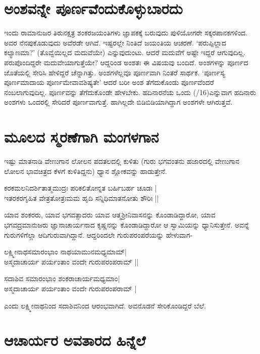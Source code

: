 \section*{ಅಂಶವನ್ನೇ ಪೂರ್ಣವೆಂದುಕೊಳ್ಳುಬಾರದು}

ಇಂದು ರಾಮಾನುಜರ ತಿರುನಕ್ಷತ್ರ ಶಂಕರಜಯಂತಿಗಳು ಜ್ಞಾಪಕಕ್ಕೆ ಬರುವುದು ಪುಳಿಯೋಗರೇ ಸಕ್ಕರಪಾನಕಗಳಿಂದ. ಅವರ ನೆನಪುಕೊಡುವುದು ಅವೆರಡೇ ಆಗಿವೆ. ಇಷ್ಟರಲ್ಲೇ ನಿಂತಿದೆ ಜಯಂತಿಯ ಆಚರಣೆ. `ಪರುಪ್ಪಿಲ್ಲಾದ ಕಲ್ಯಾಣಮಾ?' (ತೊವ್ವೆಯಿಲ್ಲದ ಮದುವೆಯೇ) ಎನ್ನುವುದುಂಟು. ಆದರೆ ಮದುವೆಗೆ ಅಷ್ಟೇ ಇದ್ದರೆ ಆಗುವುದಿಲ್ಲ. ಪರುಪೊಂದಿದ್ದರೇ ಮದುವೇಯಾಗುತ್ತೆಯೇ? ಆದ್ದರಿಂಡ ಅಂಶತಃ ಈ ವಿಷಯವು ಬಂದಿದೆ. ಅಂಶಗಳನ್ನು  ಪೂರ್ಣದ ಜೊತೆಯಲ್ಲಿ ಸೇರಿಸಿ ಹೇಳಿದ್ದರೆ ಚೆನ್ನಾಗಿತ್ತು. ಅಂಶಗಳೆಲ್ಲವೂ ಪೂರ್ಣವಾಗಿ ನಿಂತರೆ ಸಾರ್ಥಕ. `ಪೂರ್ಣಸ್ಯ ಪೂರ್ಣಮಾದಾಯ\label{48a} ಪೂರ್ಣಮೇವಾವಶಿಷ್ಯತೇ' ಆದರೆ ಬರೀ ಅಂಶ ತೆಗೆದುಕೊಂಡು ಪೂರ್ಣವೆಂದರೆ ನಂಬಲಾಗುವುದಿಲ್ಲ. ಪೂರ್ಣವನ್ನು ತೆಗೆದುಕೊಂಡೇ ಹೇಳಬೇಕು. ಹದಿನಾರನೆಯ ಒಂದು {(/16)}ಎನ್ನುವಾಗ ಹದಿನಾರು ಅಂಶಗಳು ಒಂದರಲ್ಲಿ ಸೇರಿದರೆ ಪೂರ್ಣವಾಗುತ್ತೆ. ಹಾಗಿಲ್ಲದೇ ಬಿಡಿಬಿಡಿಯಾಗಿದ್ದಾಗ ಅಂಶಗಳೇ ಆಗಿರುತ್ತವೆ.

\section*{ಮೂಲದ ಸ್ಮರಣೆಗಾಗಿ ಮಂಗಳಗಾನ}

ಇಷ್ಟು ಮಾತನಾಡಿ ವೇಣುಗಾನ ಲೋಲನ ಪದತಲದಲ್ಲಿ ಕುಳಿತು (ಗುರು ಭಗವಂತನು ಹಜಾರದಲ್ಲಿ ವೇಣುಗಾನ ಲೋಲನ ಭಾವಚಿತ್ರದ ಕೆಳಗೆ ಕುಳಿತಿದ್ದನು) ಧ್ಯಾನ ಶ್ಲೋಕವನ್ನು ಹಾಡುತ್ತೇನೆ.

\begin{shloka}
ಕರಕಮಲನಿದರ್ಶಿತಾತ್ಮಮುದ್ರಃ ಪರಿಕಲಿತೋನ್ನತ ಬರ್ಹಿಬರ್ಹ ಚೂಡಃ |\label{48}\\%
ಇತರಕರಗೃಹಿತ ವೇತ್ರತೋತ್ರಃಮಮ ಹೃದಿ ಸನ್ನಿಧಿಮಾತನೋತು ಶೌರಿಃ ||
\end{shloka}

ಯಾವ ಶಂಕರರು, ಯಾವ ಭಗವತ್ಪಾದರು ಯಾವ ಆತ್ಮಶ್ರೀನಿವಾಸನನ್ನು ಕೊಂಡಾಡಿದ್ದಾರೋ, ಯಾವ ಭಗವದ್ರಮಾನುಜರು ಜ್ಞಾನಾಚಾರ್ಯನಾದ ಕೃಷ್ಣನನ್ನು ಕೊಂಡಾಡಿದ್ದಾರೋ ಆ ಸ್ವಾಮಿಯನ್ನು ಧ್ಯಾನಿಸುತ್ತೇನೆ. ಅವನ್ನೆ ಗುರುಗಳಿಗೆಲ್ಲಾ ಆದಿಗುರುವಾಗಿದ್ದಾನೆ. ಆದ್ದರಿಂದಲೇ ಗುರುಪರಂಪರೆಯನ್ನು ಹೇಳುವಾಗ-

\begin{shloka}
ಲಕ್ಷ್ಮೀನಾಥಸಮಾರಂಭಾಂ ನಾಥಯಾಮುನಮಧ್ಯಮಾಮ್|\label{48b}\\
ಅಸ್ಮದಾಚಾರ್ಯ ಪರ್ಯಂತಾಂ ವಂದೇ ಗುರುಪರಂಪರಾಮ್ ||
\end{shloka}

\begin{shloka}
ಸದಾಶಿವ ಸಮಾರಂಭಾಂ ಶಂಕರಾಚಾರ್ಯಮಧ್ಯಮಾಂ|\\
ಅಸ್ಮದಾಚಾರ್ಯ ಪರ್ಯಂತಾಂ ವಂದೇ ಗುರುಪರಂಪರಾಮ್ |
\end{shloka}
ಎಂದು ಲಕ್ಷ್ಮೀನಾಥನಿಂದ ಸದಾಶಿವನಿಂದ ಆರಂಭವಾಗಿದೆ. ಅವನೊಡನೆ ಸೇರಿಕೊಂಡಿದ್ದರೆ ಬೆಲೆ.

\section*{ಆಚಾರ್ಯರ ಅವತಾರದ ಹಿನ್ನೆಲೆ}

